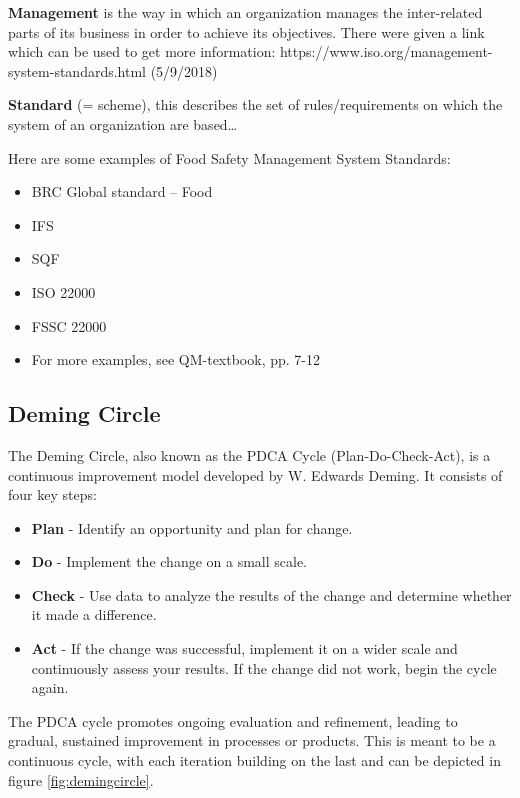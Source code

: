 \textbf{Management} is the way in which an organization manages the inter-related parts of its business in order to achieve its objectives.
There were given a link which can be used to get more information:
https://www.iso.org/management-system-standards.html
(5/9/2018)

\textbf{Standard} (= scheme), this describes the set of rules/requirements on which the system of an organization are based…

Here are some examples of Food Safety Management System Standards:
\begin{highlight}
    \begin{itemize}
        \item BRC Global standard – Food
        \item IFS
        \item SQF
        \item ISO 22000
        \item FSSC 22000
        \item For more examples, see QM-textbook, pp. 7-12
    \end{itemize}
\end{highlight}

\subsection{Deming Circle}
The Deming Circle, also known as the PDCA Cycle (Plan-Do-Check-Act), is a continuous improvement model developed by W. Edwards Deming. It consists of four key steps:

\begin{highlight}
    \begin{itemize}
        \item \textbf{Plan} - Identify an opportunity and plan for change.
        \item \textbf{Do} - Implement the change on a small scale.
        \item \textbf{Check} - Use data to analyze the results of the change and determine whether it made a difference.
        \item \textbf{Act} - If the change was successful, implement it on a wider scale and continuously assess your results. If the change did not work, begin the cycle again.
    \end{itemize}
\end{highlight}

The PDCA cycle promotes ongoing evaluation and refinement, leading to gradual, sustained improvement in processes or products. This is meant to be a continuous cycle, with each iteration building on the last and can be depicted in figure \ref{fig:demingcircle}.


